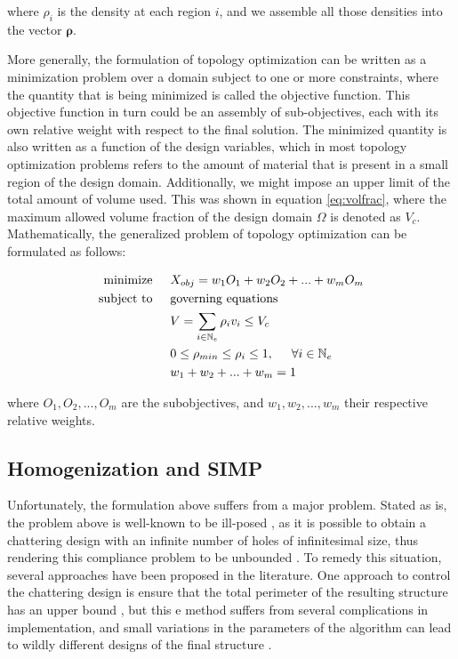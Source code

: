 \documentclass[../main.tex]{subfiles}
\begin{document}
where $\rho_i$ is the density at each region $i$, and we assemble all those densities into the vector $\bm{\rho}$. 

More generally, the formulation of topology optimization can be written as a minimization problem over a domain subject to one or more constraints, where the quantity that is being minimized is called the objective function. This objective function in turn could be an assembly of sub-objectives, each with its own relative weight with respect to the final solution. The minimized quantity is also written as a function of the design variables, which in most topology optimization problems refers to the amount of material that is present in a small region of the design domain. Additionally, we might impose an upper limit of the total amount of volume used. This was shown in equation \ref{eq:volfrac}, where the maximum allowed volume fraction of the design domain $\Omega$ is denoted as $V_c$. Mathematically, the generalized problem of topology optimization can be formulated as follows:

\begin{align}
  \text{minimize}  & \hspace{0.5cm} X_{obj} = w_1 O_1 + w_2 O_2 + ... + w_m O_m  \nonumber \\ 
  \text{subject to} & \hspace{0.5cm} \text{governing equations}  \\ 
                    & \hspace{0.5cm} V = \sum _{i \in \mathbb{N}_e} \rho_i v_i \leq V_c \nonumber \\ 
                    & \hspace{0.5cm} 0 \leq \rho_{min} \leq \rho_i \leq 1, \hspace{0.5cm} \forall i \in \mathbb{N}_e \nonumber \\
        & \hspace{0.5cm} w_1 + w_2 + ... + w_m = 1 \nonumber 
 \end{align}

 where $O_1, O_2, ... , O_m$ are the subobjectives, and $w_1, w_2, ... , w_m$ their respective relative weights.

\subsection{Homogenization and SIMP}
Unfortunately, the formulation above suffers from a major problem. Stated as is, the problem above is well-known to be ill-posed \cite{kohnOptimalDesignRelaxation1986}, as it is possible to obtain a chattering design with an infinite number of holes of infinitesimal size, thus rendering this compliance problem to be unbounded \cite{liuEfficient3DTopology2014}. To remedy this situation, several approaches have been proposed in the literature. One approach to control the chattering design is ensure that the total perimeter of the resulting structure has an upper bound \cite{haberNewApproachVariabletopology1996} \cite{jogTopologyDesignStructures2002}, but this e method suffers from several complications in implementation, and small variations in the parameters of the algorithm can lead to wildly different designs of the final structure \cite{jogTopologyDesignStructures2002}.
\end{document}
